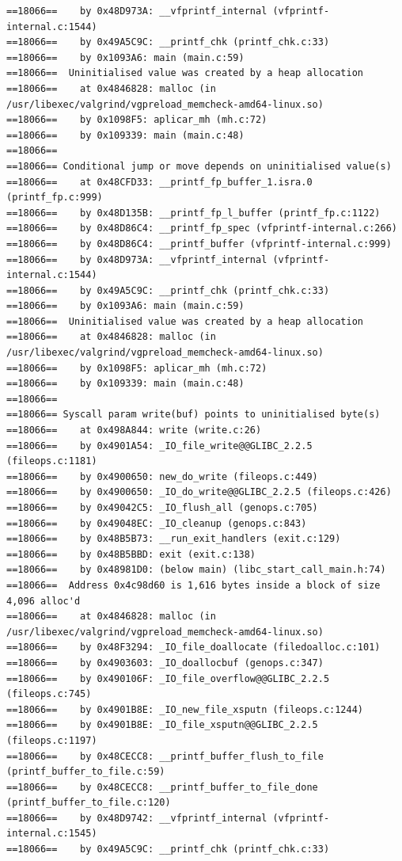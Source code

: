 \documentclass[12pt]{article}
\begin{document}
\begin{lstlisting}[style=EstiloValgrind]
==18066==    by 0x48D973A: __vfprintf_internal (vfprintf-internal.c:1544)
==18066==    by 0x49A5C9C: __printf_chk (printf_chk.c:33)
==18066==    by 0x1093A6: main (main.c:59)
==18066==  Uninitialised value was created by a heap allocation
==18066==    at 0x4846828: malloc (in /usr/libexec/valgrind/vgpreload_memcheck-amd64-linux.so)
==18066==    by 0x1098F5: aplicar_mh (mh.c:72)
==18066==    by 0x109339: main (main.c:48)
==18066== 
==18066== Conditional jump or move depends on uninitialised value(s)
==18066==    at 0x48CFD33: __printf_fp_buffer_1.isra.0 (printf_fp.c:999)
==18066==    by 0x48D135B: __printf_fp_l_buffer (printf_fp.c:1122)
==18066==    by 0x48D86C4: __printf_fp_spec (vfprintf-internal.c:266)
==18066==    by 0x48D86C4: __printf_buffer (vfprintf-internal.c:999)
==18066==    by 0x48D973A: __vfprintf_internal (vfprintf-internal.c:1544)
==18066==    by 0x49A5C9C: __printf_chk (printf_chk.c:33)
==18066==    by 0x1093A6: main (main.c:59)
==18066==  Uninitialised value was created by a heap allocation
==18066==    at 0x4846828: malloc (in /usr/libexec/valgrind/vgpreload_memcheck-amd64-linux.so)
==18066==    by 0x1098F5: aplicar_mh (mh.c:72)
==18066==    by 0x109339: main (main.c:48)
==18066== 
==18066== Syscall param write(buf) points to uninitialised byte(s)
==18066==    at 0x498A844: write (write.c:26)
==18066==    by 0x4901A54: _IO_file_write@@GLIBC_2.2.5 (fileops.c:1181)
==18066==    by 0x4900650: new_do_write (fileops.c:449)
==18066==    by 0x4900650: _IO_do_write@@GLIBC_2.2.5 (fileops.c:426)
==18066==    by 0x49042C5: _IO_flush_all (genops.c:705)
==18066==    by 0x49048EC: _IO_cleanup (genops.c:843)
==18066==    by 0x48B5B73: __run_exit_handlers (exit.c:129)
==18066==    by 0x48B5BBD: exit (exit.c:138)
==18066==    by 0x48981D0: (below main) (libc_start_call_main.h:74)
==18066==  Address 0x4c98d60 is 1,616 bytes inside a block of size 4,096 alloc'd
==18066==    at 0x4846828: malloc (in /usr/libexec/valgrind/vgpreload_memcheck-amd64-linux.so)
==18066==    by 0x48F3294: _IO_file_doallocate (filedoalloc.c:101)
==18066==    by 0x4903603: _IO_doallocbuf (genops.c:347)
==18066==    by 0x490106F: _IO_file_overflow@@GLIBC_2.2.5 (fileops.c:745)
==18066==    by 0x4901B8E: _IO_new_file_xsputn (fileops.c:1244)
==18066==    by 0x4901B8E: _IO_file_xsputn@@GLIBC_2.2.5 (fileops.c:1197)
==18066==    by 0x48CECC8: __printf_buffer_flush_to_file (printf_buffer_to_file.c:59)
==18066==    by 0x48CECC8: __printf_buffer_to_file_done (printf_buffer_to_file.c:120)
==18066==    by 0x48D9742: __vfprintf_internal (vfprintf-internal.c:1545)
==18066==    by 0x49A5C9C: __printf_chk (printf_chk.c:33)

\end{lstlisting}
\end{document}
